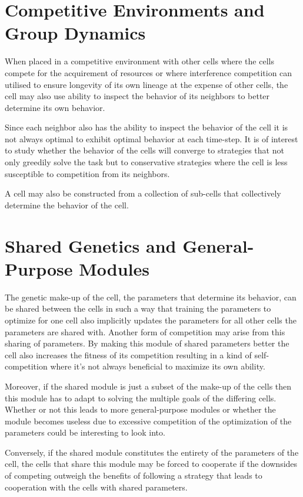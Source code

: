 \documentclass[a4paper]{article}
\begin{document}
\section{Competitive Environments and Group Dynamics}

When placed in a competitive environment with other cells where the cells compete for the acquirement of resources or where interference competition can utilised to ensure longevity of its own lineage at the expense of other cells, the cell may also use ability to inspect the behavior of its neighbors to better determine its own behavior.

Since each neighbor also has the ability to inspect the behavior of the cell it is not always optimal to exhibit optimal behavior at each time-step.
%
It is of interest to study whether the behavior of the cells will converge to strategies that not only greedily solve the task but to conservative strategies where the cell is less susceptible to competition from its neighbors.

A cell may also be constructed from a collection of sub-cells that collectively determine the behavior of the cell.

\section{Shared Genetics and General-Purpose Modules}

The genetic make-up of the cell, the parameters that determine its behavior, can be shared between the cells in such a way that training the parameters to optimize for one cell also implicitly updates the parameters for all other cells the parameters are shared with.
%
Another form of competition may arise from this sharing of parameters.
%
By making this module of shared parameters better the cell also increases the fitness of its competition resulting in a kind of self-competition where it's not always beneficial to maximize its own ability.

Moreover, if the shared module is just a subset of the make-up of the cells then this module has to adapt to solving the multiple goals of the differing cells.
%
Whether or not this leads to more general-purpose modules or whether the module becomes useless due to excessive competition of the optimization of the parameters could be interesting to look into.

Conversely, if the shared module constitutes the entirety of the parameters of the cell, the cells that share this module may be forced to cooperate if the downsides of competing outweigh the benefits of following a strategy that leads to cooperation with the cells with shared parameters.
\end{document}
